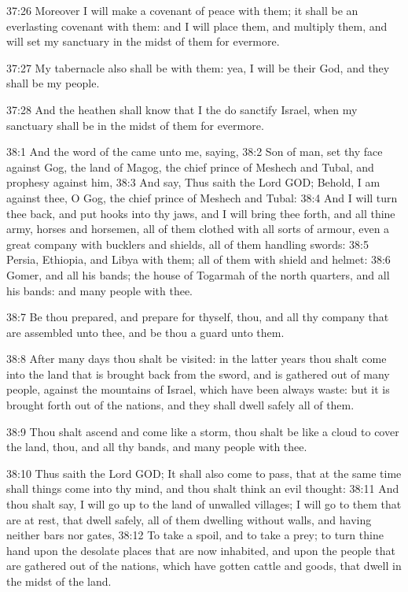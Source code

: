 37:26 Moreover I will make a covenant of peace with them; it shall be an everlasting covenant with them: and I will place them, and multiply them, and will set my sanctuary in the midst of them for evermore.

37:27 My tabernacle also shall be with them: yea, I will be their God, and they shall be my people.

37:28 And the heathen shall know that I the \LORD do sanctify Israel, when my sanctuary shall be in the midst of them for evermore.

38:1 And the word of the \LORD came unto me, saying, 38:2 Son of man, set thy face against Gog, the land of Magog, the chief prince of Meshech and Tubal, and prophesy against him, 38:3 And say, Thus saith the Lord GOD; Behold, I am against thee, O Gog, the chief prince of Meshech and Tubal: 38:4 And I will turn thee back, and put hooks into thy jaws, and I will bring thee forth, and all thine army, horses and horsemen, all of them clothed with all sorts of armour, even a great company with bucklers and shields, all of them handling swords: 38:5 Persia, Ethiopia, and Libya with them; all of them with shield and helmet: 38:6 Gomer, and all his bands; the house of Togarmah of the north quarters, and all his bands: and many people with thee.

38:7 Be thou prepared, and prepare for thyself, thou, and all thy company that are assembled unto thee, and be thou a guard unto them.

38:8 After many days thou shalt be visited: in the latter years thou shalt come into the land that is brought back from the sword, and is gathered out of many people, against the mountains of Israel, which have been always waste: but it is brought forth out of the nations, and they shall dwell safely all of them.

38:9 Thou shalt ascend and come like a storm, thou shalt be like a cloud to cover the land, thou, and all thy bands, and many people with thee.

38:10 Thus saith the Lord GOD; It shall also come to pass, that at the same time shall things come into thy mind, and thou shalt think an evil thought: 38:11 And thou shalt say, I will go up to the land of unwalled villages; I will go to them that are at rest, that dwell safely, all of them dwelling without walls, and having neither bars nor gates, 38:12 To take a spoil, and to take a prey; to turn thine hand upon the desolate places that are now inhabited, and upon the people that are gathered out of the nations, which have gotten cattle and goods, that dwell in the midst of the land.

